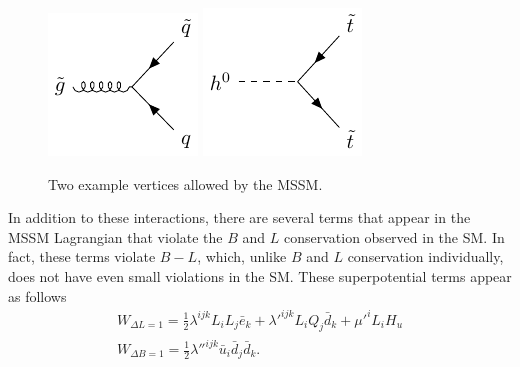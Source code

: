 \begin{centering}
\begin{figure}[!hbt]
\myfloatalign
\includegraphics[width=.45\linewidth]{feynman/gluino.pdf}
\includegraphics[width=.45\linewidth]{feynman/higgs_stop.pdf}
\caption{Two example vertices allowed by the \ac{MSSM}.}
\label{fig:mssm_int}
\end{figure}
\end{centering}

In addition to these interactions, there are several terms that appear in the \ac{MSSM} Lagrangian that violate the $B$ and $L$ conservation observed in the \ac{SM}. In fact, these terms violate $B-L$, which, unlike $B$ and $L$ conservation individually, does not have even small violations in the \ac{SM}. These superpotential terms appear as follows
%
\begin{eqnarray}
W_{\Delta L = 1} = \frac{1}{2}\lambda^{ijk}L_i L_j \bar{e}_k + \lambda'^{ijk}L_i Q_j \bar{d}_k + \mu'^i L_i H_u \\
W_{\Delta B = 1} = \frac{1}{2}\lambda''^{ijk}\bar{u}_i \bar{d}_j \bar{d}_k .
\label{eq:rviol}
\end{eqnarray}

